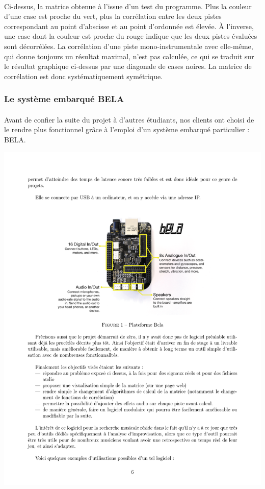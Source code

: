 \paragraph{}
Ci-dessus, la matrice obtenue à l'issue d'un test du programme. Plus
la couleur d'une case est proche du vert, plus la corrélation entre
les deux pistes correspondant au point d'abscisse et au point
d'ordonnée est élevée. À l'inverse, une case dont la couleur est
proche du rouge indique que les deux pistes évaluées sont
décorrélées. La corrélation d'une piste mono-instrumentale avec
elle-même, qui donne toujours un résultat maximal, n'est pas calculée,
ce qui se traduit sur le résultat graphique ci-dessus par une
diagonale de cases noires. La matrice de corrélation est donc
systématiquement symétrique.

\subsubsection{Le système embarqué BELA}
\paragraph{}
Avant de confier la suite du projet à d'autres étudiants, nos clients
ont choisi de le rendre plus fonctionnel grâce à l'emploi d'un système
embarqué particulier : BELA.

\includegraphics[scale=1]{bela.png}

